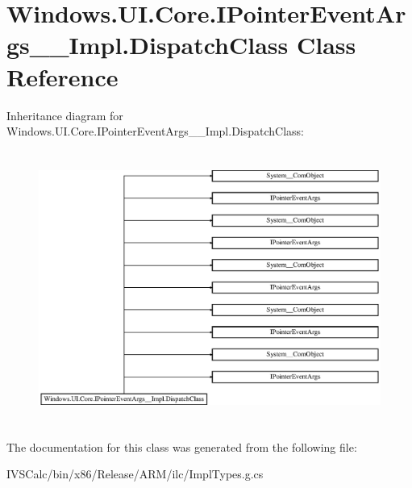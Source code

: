 \hypertarget{class_windows_1_1_u_i_1_1_core_1_1_i_pointer_event_args_____impl_1_1_dispatch_class}{}\section{Windows.\+U\+I.\+Core.\+I\+Pointer\+Event\+Args\+\_\+\+\_\+\+Impl.\+Dispatch\+Class Class Reference}
\label{class_windows_1_1_u_i_1_1_core_1_1_i_pointer_event_args_____impl_1_1_dispatch_class}
Inheritance diagram for Windows.\+U\+I.\+Core.\+I\+Pointer\+Event\+Args\+\_\+\+\_\+\+Impl.\+Dispatch\+Class\+:\begin{figure}[H]
\begin{center}
\leavevmode
\includegraphics[height=8.979592cm]{class_windows_1_1_u_i_1_1_core_1_1_i_pointer_event_args_____impl_1_1_dispatch_class}
\end{center}
\end{figure}


The documentation for this class was generated from the following file\+:\begin{DoxyCompactItemize}
\item 
I\+V\+S\+Calc/bin/x86/\+Release/\+A\+R\+M/ilc/Impl\+Types.\+g.\+cs\end{DoxyCompactItemize}
